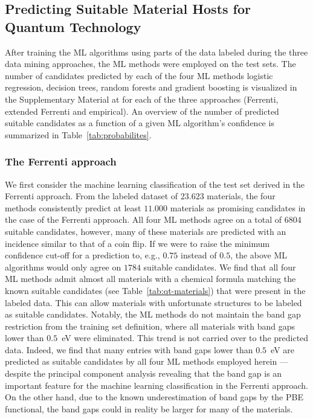 \documentclass[superscriptaddress,unsortedaddress,
 amsmath,amssymb,
 aps,
]{revtex4-2}
\begin{document}
\subsection*{Predicting Suitable Material Hosts for Quantum Technology} 
After training the ML algorithms using parts of the data labeled during the three data mining approaches, the ML methods were employed on the test sets. 
The number of candidates predicted by each of the four ML methods logistic regression, decision trees, random forests and gradient boosting is visualized in the Supplementary Material at \cite{supplementary} for each of the three approaches (Ferrenti, extended Ferrenti and empirical). 
An overview of the number of predicted suitable candidates as a function of a given ML algorithm's confidence is summarized in  Table~\ref{tab:probabilites}. 

\subsubsection*{The Ferrenti approach}

We first consider the machine learning classification of the test set derived in the Ferrenti approach. From the labeled dataset of $23.623$ materials, the four methods consistently predict at least $11.000$ materials as promising candidates in the case of the Ferrenti approach. All four ML methods agree on a total of $6804$ suitable candidates, however, many of these materials are predicted with an incidence similar to that of a coin flip. If we were to raise the minimum confidence cut-off for a prediction to, e.g., $0.75$ instead of $0.5$, the above ML algorithms would only agree on $1784$ suitable candidates. 
We find that all four ML methods admit almost all materials with a chemical formula matching the known suitable candidates (see Table~\ref{tab:qt-materials}) that were present in the labeled data. This can allow materials with unfortunate structures to be labeled as suitable candidates. Notably, the ML methods do not maintain the band gap restriction from the training set definition, where all materials with band gaps lower than $0.5$~eV were eliminated. 
This trend is not carried over to the predicted data. Indeed, we find that many entries with band gaps lower than $0.5$~eV are predicted as suitable candidates by all four ML methods employed herein 
--- despite the principal component analysis revealing that the band gap is an important feature for the machine learning classification in the Ferrenti approach.  
On the other hand, due to the known underestimation of band gaps by the PBE functional, the band gaps could in reality be larger for many of the materials. 
\end{document}
